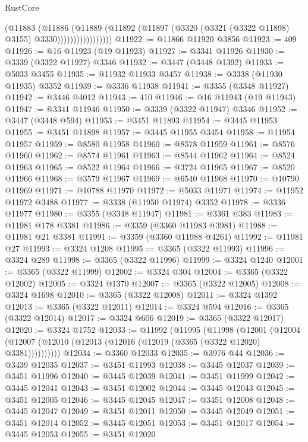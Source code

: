 \begin{lexlean}{RustCore}
\begin{coremodule}
                          (@11883
                            (@11886
                              (@11889
                                (@11892
                                  (@11897 (@3320 (@3321 (@3322 @11898) @3155) @3330)))))))))))))))))
@11922 := @11866 @11920 @3856
@11923 := 409
@11926 := @16 @11923 (@19 @11923)
@11927 := @3341 @11926
@11930 := @3339 (@3322 @11927) @3346
@11932 := @3447 (@3448 @1392)
@11933 := @5033 @3455
@11935 := @11932 @11933 @3457
@11938 := @3338 (@11930 @11935) @3352
@11939 := @3336 @11938
@11941 := @3355 (@3348 @11927)
@11942 := @3446 @4012
@11943 := 410
@11946 := @16 @11943 (@19 @11943)
@11947 := @3341 @11946
@11950 := @3339 (@3322 @11947) @3346
@11952 := @3447 (@3448 @594)
@11953 := @3451 @11893
@11954 := @3445 @11953
@11955 := @3451 @11898
@11957 := @3445 @11955 @3454
@11958 := @11954 @11957
@11959 := @8580 @11958
@11960 := @8578 @11959
@11961 := @8576 @11960
@11962 := @8574 @11961
@11963 := @8544 @11962
@11964 := @8524 @11963
@11965 := @8522 @11964
@11966 := @3724 @11965
@11967 := @8520 @11966
@11968 := @3579 @11967
@11969 := @6540 @11968
@11970 := @10790 @11969
@11971 := @10788 @11970
@11972 := @5033 @11971
@11974 := @11952 @11972 @3488
@11977 := @3338 (@11950 @11974) @3352
@11978 := @3336 @11977
@11980 := @3355 (@3348 @11947)
@11981 := @3361 @383
@11983 := @11981 @178 @3381
@11986 := @3359 (@3360 @11983 @3981)
@11988 := @11981 @21 @3381
@11991 := @3359 (@3360 @11988 @4261)
@11992 := @11981 @27
@11993 := @3324 @1208
@11995 := @3365 (@3322 @11993)
@11996 := @3324 @289
@11998 := @3365 (@3322 @11996)
@11999 := @3324 @1240
@12001 := @3365 (@3322 @11999)
@12002 := @3324 @304
@12004 := @3365 (@3322 @12002)
@12005 := @3324 @1370
@12007 := @3365 (@3322 @12005)
@12008 := @3324 @1698
@12010 := @3365 (@3322 @12008)
@12011 := @3324 @1392
@12013 := @3365 (@3322 @12011)
@12014 := @3324 @594
@12016 := @3365 (@3322 @12014)
@12017 := @3324 @606
@12019 := @3365 (@3322 @12017)
@12020 := @3324 @1752
@12033 := @11992
    (@11995
      (@11998
        (@12001
          (@12004 (@12007 (@12010 (@12013 (@12016 (@12019 (@3365 (@3322 @12020) @3381))))))))))
@12034 := @3360 @12033
@12035 := @3976 @44
@12036 := @3439 @12035
@12037 := @3451 @11993
@12038 := @3445 @12037
@12039 := @3451 @11996
@12040 := @3445 @12039
@12041 := @3451 @11999
@12042 := @3445 @12041
@12043 := @3451 @12002
@12044 := @3445 @12043
@12045 := @3451 @12005
@12046 := @3445 @12045
@12047 := @3451 @12008
@12048 := @3445 @12047
@12049 := @3451 @12011
@12050 := @3445 @12049
@12051 := @3451 @12014
@12052 := @3445 @12051
@12053 := @3451 @12017
@12054 := @3445 @12053
@12055 := @3451 @12020

\end{coremodule}
\end{lexlean}
